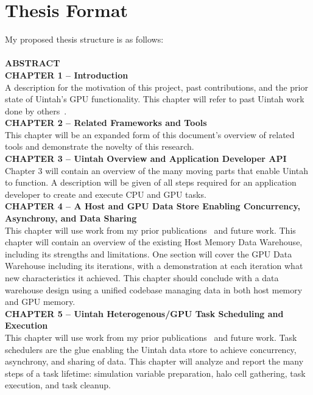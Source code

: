 \documentclass[12pt]{article}
\begin{document}
\section{Thesis Format}
\label{ch:thesis_format}

My proposed thesis structure is as follows:\\
\\
\textbf{ABSTRACT}\\
\textbf{CHAPTER 1 – Introduction}\\
A description for the motivation of this project, past contributions, and the prior state of Uintah's GPU functionality. This chapter will refer to past Uintah work done by others~\cite{wolfhpc12, meng-dissertation}.\\  
\textbf{CHAPTER 2 – Related Frameworks and Tools}\\
This chapter will be an expanded form of this document's overview of related tools and demonstrate the novelty of this research.\\  
\textbf{CHAPTER 3 – Uintah Overview and Application Developer API}\\
Chapter 3 will contain an overview of the many moving parts that enable Uintah to function.  A description will be given of all steps required for an application developer to create and execute CPU and GPU tasks.  \\  
\textbf{CHAPTER 4 -- A Host and GPU Data Store Enabling Concurrency, Asynchrony, and Data Sharing}\\ 
This chapter will use work from my prior publications~\cite{wolfhpc15,ijpp16,espm2-brad} and future work.  This chapter will contain an overview of the existing Host Memory Data Warehouse, including its strengths and limitations.  One section will cover the GPU Data Warehouse including its iterations, with a demonstration at each iteration what new characteristics it achieved.  This chapter should conclude with a data warehouse design using a unified codebase managing data in both host memory and GPU memory.\\  
\textbf{CHAPTER 5 – Uintah Heterogenous/GPU Task Scheduling and Execution}\\
This chapter will use work from my prior publications~\cite{wolfhpc15,ijpp16,espm2-brad} and future work.  
Task schedulers are the glue enabling the Uintah data store to achieve concurrency, asynchrony, and sharing of data.  This chapter will analyze and report the many steps of a task lifetime: simulation variable preparation, halo cell gathering, task execution, and task cleanup.\\ 
\end{document}
